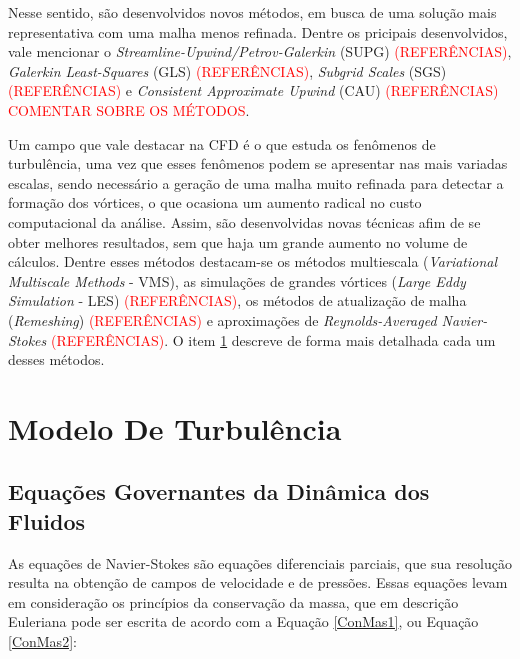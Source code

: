 \documentclass[_ArquivoPrincipal.tex]{subfiles}
\begin{document}
Nesse sentido, são desenvolvidos novos métodos, em busca de uma solução mais representativa com uma malha menos refinada. Dentre os pricipais desenvolvidos, vale mencionar o \textit{Streamline-Upwind/Petrov-Galerkin} (SUPG) \textcolor{red}{(REFERÊNCIAS)}, \textit{Galerkin Least-Squares} (GLS) \textcolor{red}{(REFERÊNCIAS)}, \textit{Subgrid Scales} (SGS) \textcolor{red}{(REFERÊNCIAS)} e \textit{Consistent Approximate Upwind} (CAU) \textcolor{red}{(REFERÊNCIAS)} \textcolor{red}{COMENTAR SOBRE OS MÉTODOS}.

Um campo que vale destacar na CFD é o que estuda os fenômenos de turbulência, uma vez que esses fenômenos podem se apresentar nas mais variadas escalas, sendo necessário a geração de uma malha muito refinada para detectar a formação dos vórtices, o que ocasiona um aumento radical no custo computacional da análise. Assim, são desenvolvidas novas técnicas afim de se obter melhores resultados, sem que haja um grande aumento no volume de cálculos. Dentre esses métodos destacam-se os métodos multiescala (\textit{Variational Multiscale Methods} - VMS), as simulações de grandes vórtices (\textit{Large Eddy Simulation} - LES) \textcolor{red}{(REFERÊNCIAS)}, os métodos de atualização de malha (\textit{Remeshing}) \textcolor{red}{(REFERÊNCIAS)} e aproximações de \textit{Reynolds-Averaged Navier-Stokes} \textcolor{red}{(REFERÊNCIAS)}. O item \ref{MT} descreve de forma mais detalhada cada um desses métodos.

\section{Modelo De Turbulência} \label{MT}

\subsection{Equações Governantes da Dinâmica dos Fluidos} \label{EqGov}

As equações de Navier-Stokes são equações diferenciais parciais, que sua resolução resulta na obtenção de campos de velocidade e de pressões. Essas equações levam em consideração os princípios da conservação da massa, que em descrição Euleriana pode ser escrita de acordo com a Equação \ref{ConMas1}, ou Equação \ref{ConMas2}:
\end{document}
